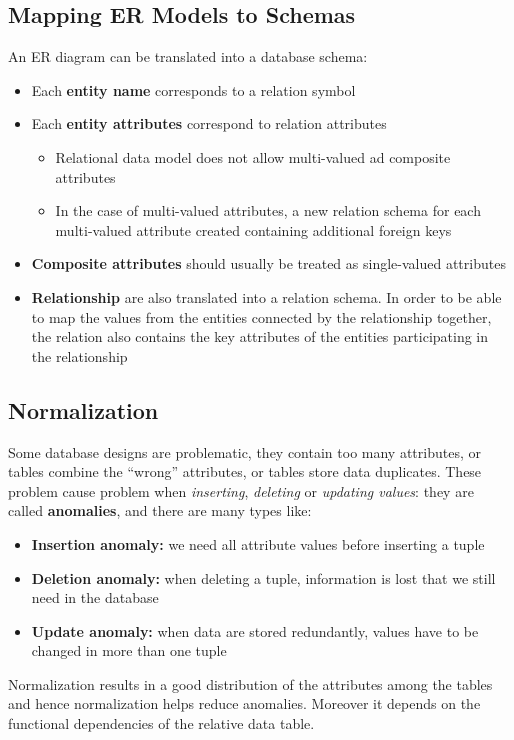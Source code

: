 \subsection{Mapping ER Models to Schemas}
An ER diagram can be translated into a database schema:
\begin{itemize}
    \item Each \textbf{entity name} corresponds to a relation symbol
    \item Each \textbf{entity attributes} correspond to relation attributes
    \begin{itemize}
        \item Relational data model does not allow multi-valued ad composite attributes
        \item In the case of multi-valued attributes, a new relation schema for each multi-valued attribute created containing additional foreign keys 
    \end{itemize}
    \item \textbf{Composite attributes} should usually be treated as single-valued attributes
    \item \textbf{Relationship} are also translated into a relation schema. In order to be able to map the values from the entities connected by the relationship together, the relation also contains the key attributes of the entities participating in the relationship
\end{itemize}

\subsection{Normalization}
Some database designs are problematic, they contain too many attributes, or tables combine the “wrong” attributes, or tables store data duplicates. These problem cause problem when \textit{inserting}, \textit{deleting} or \textit{updating values}: they are called \textbf{anomalies}, and there are many types like:
\begin{itemize}
    \item \textbf{Insertion anomaly:} we need all attribute values before inserting a tuple
    \item \textbf{Deletion anomaly:} when deleting a tuple, information is lost that we still need in the database
    \item \textbf{Update anomaly:} when data are stored redundantly, values have to be changed in more than one tuple
\end{itemize}
\begin{tcolorbox}
Normalization results in a good distribution of the attributes among the tables and hence normalization helps reduce anomalies. Moreover it depends on the functional dependencies of the relative data table.
\end{tcolorbox}

